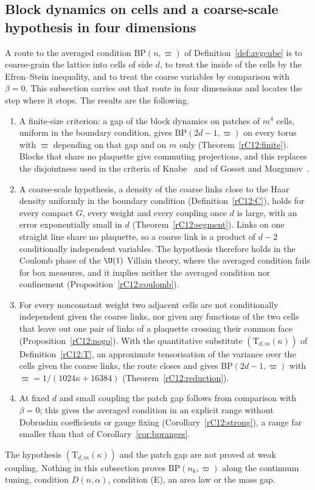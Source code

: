 \subsection{Block dynamics on cells and a coarse-scale hypothesis in four
dimensions}\label{rC12:coarse}

A route to the averaged condition $\mathrm{BP}(n,\varpi)$ of
Definition~\ref{def:avgcube} is to coarse-grain the lattice into cells of
side $d$, to treat the inside of the cells by the Efron--Stein inequality,
and to treat the coarse variables by comparison with $\beta=0$. This
subsection carries out that route in four dimensions and locates the step
where it stops. The results are the following.
\begin{enumerate}[label=\textup{(\alph*)},leftmargin=*]
\item A finite-size criterion: a gap of the block dynamics on patches of
$m^4$ cells, uniform in the boundary condition, gives
$\mathrm{BP}(2d-1,\varpi)$ on every torus with $\varpi$ depending on that gap
and on $m$ only (Theorem~\ref{rC12:finite}). Blocks that share no plaquette
give commuting projections, and this replaces the disjointness used in the
criteria of Knabe~\cite{Kna88} and of Gosset and Mozgunov~\cite{GM16}.
\item A coarse-scale hypothesis, a density of the coarse links close to the
Haar density uniformly in the boundary condition
(Definition~\ref{rC12:C}), holds for every compact $G$, every weight and
every coupling once $d$ is large, with an error exponentially small in $d$
(Theorem~\ref{rC12:segment}). Links on one straight line share no
plaquette, so a coarse link is a product of $d-2$ conditionally independent
variables. The hypothesis therefore holds in the Coulomb phase of the
$\U(1)$ Villain theory, where the averaged condition fails for box measures,
and it implies neither the averaged condition nor confinement
(Proposition~\ref{rC12:coulomb}).
\item For every nonconstant weight two adjacent cells are not
conditionally independent given the coarse links, nor given any functions
of the two cells that leave out one pair of links of a plaquette crossing
their common face (Proposition~\ref{rC12:nogo}). With the quantitative
substitute $(\mathrm T_{d,m}(\kappa))$ of Definition~\ref{rC12:T}, an
approximate tensorisation of the variance over the cells given the coarse
links, the route closes and gives $\mathrm{BP}(2d-1,\varpi)$ with
$\varpi=1/(1024\kappa+16384)$ (Theorem~\ref{rC12:reduction}).
\item At fixed $d$ and small coupling the patch gap follows from comparison
with $\beta=0$; this gives the averaged condition in an explicit range
without Dobrushin coefficients or gauge fixing
(Corollary~\ref{rC12:strong}), a range far smaller than that of
Corollary~\ref{cor:bpranges}.
\end{enumerate}
The hypothesis $(\mathrm T_{d,m}(\kappa))$ and the patch gap are not proved
at weak coupling. Nothing in this subsection proves
$\mathrm{BP}(n_k,\varpi)$ along the continuum tuning, condition $D(n,
\alpha)$, condition (E), an area law or the mass gap.

